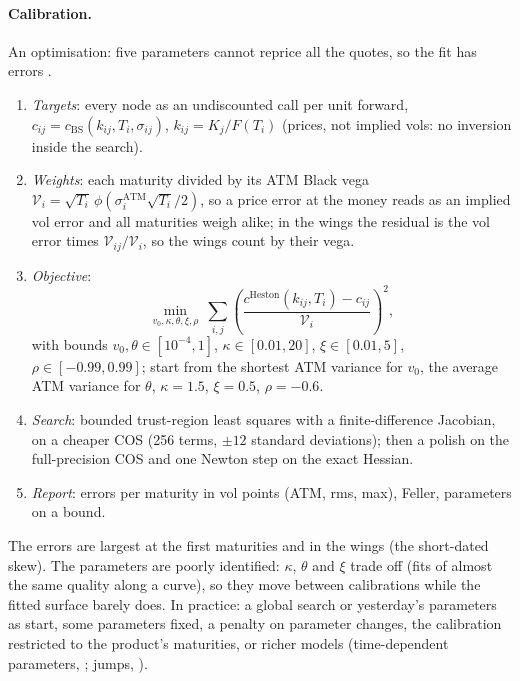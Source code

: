 \paragraph{Calibration.} An optimisation: five parameters cannot reprice all the quotes, so the fit has errors \citep[sec.~8.2.3]{oosterlee2019}.
\begin{enumerate}[nosep]
  \item \emph{Targets}: every node as an undiscounted call per unit forward, $c_{ij} = c_{\mathrm{BS}}(k_{ij}, T_i, \sigma_{ij})$, $k_{ij} = K_j/F(T_i)$
        (prices, not implied vols: no inversion inside the search).
  \item \emph{Weights}: each maturity divided by its ATM Black vega $\mathcal V_i = \sqrt{T_i}\,\phi(\sigma^{\mathrm{ATM}}_i\sqrt{T_i}/2)$, so a price error at the money
        reads as an implied vol error and all maturities weigh alike; in the wings the residual is the vol error times
        $\mathcal V_{ij}/\mathcal V_i$, so the wings count by their vega.
  \item \emph{Objective}:
        \[
          \min_{v_0, \kappa, \theta, \xi, \rho}\ \sum_{i,j} \left(\frac{c^{\mathrm{Heston}}(k_{ij}, T_i) - c_{ij}}{\mathcal V_i}\right)^2 ,
        \]
        with bounds $v_0, \theta \in [10^{-4}, 1]$, $\kappa \in [0.01, 20]$, $\xi \in [0.01, 5]$, $\rho \in [-0.99, 0.99]$; start from the shortest ATM variance for
        $v_0$, the average ATM variance for $\theta$, $\kappa = 1.5$, $\xi = 0.5$, $\rho = -0.6$.
  \item \emph{Search}: bounded trust-region least squares with a finite-difference Jacobian, on a cheaper COS (256 terms,
        $\pm 12$ standard deviations); then a polish on the full-precision COS and one Newton step on the exact Hessian.
  \item \emph{Report}: errors per maturity in vol points (ATM, rms, max), Feller, parameters on a bound.
\end{enumerate}
The errors are largest at the first maturities and in the wings (the short-dated skew). The parameters are poorly
identified: $\kappa$, $\theta$ and $\xi$ trade off (fits of almost the same quality along a curve), so they move between
calibrations while the fitted surface barely does. In practice: a global search or yesterday's parameters as start,
some parameters fixed, a penalty on parameter changes, the calibration restricted to the product's maturities, or
richer models (time-dependent parameters, \citealp{andersen2010}; jumps, \citealp{bates1996}).

